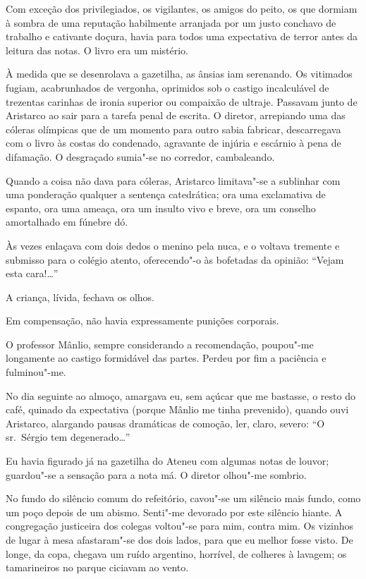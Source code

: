 Com exceção dos privilegiados, os vigilantes,
os amigos do peito, os que dormiam à sombra de uma reputação habilmente
arranjada por um justo conchavo de trabalho e cativante doçura, havia
para todos uma expectativa de terror antes da leitura das notas. O
livro era um mistério. 


À medida que se desenrolava a gazetilha, as
ânsias iam serenando. Os vitimados fugiam, acabrunhados de vergonha,
oprimidos sob o castigo incalculável de trezentas carinhas de ironia
superior ou compaixão de ultraje. Passavam junto de Aristarco ao sair
para a tarefa penal de escrita. O diretor, arrepiando uma das cóleras
olímpicas que de um momento para outro sabia fabricar, descarregava com
o livro às costas do condenado, agravante de injúria e escárnio à pena
de difamação. O desgraçado sumia"-se no corredor, cambaleando. 

Quando a coisa não dava para cóleras, Aristarco limitava"-se a sublinhar com
uma ponderação qualquer a sentença catedrática; ora uma exclamativa de
espanto, ora uma ameaça, ora um insulto vivo e breve, ora um conselho
amortalhado em fúnebre dó. 

Às vezes enlaçava com dois dedos o menino
pela nuca, e o voltava tremente e submisso para o colégio atento,
oferecendo"-o às bofetadas da opinião: ``Vejam esta cara!\ldots{}'' 

A criança, lívida, fechava os olhos. 

Em compensação, não havia expressamente punições corporais. 

O professor Mânlio, sempre
considerando a recomendação, poupou"-me longamente ao castigo
formidável das partes. Perdeu por fim a paciência e fulminou"-me. 

No dia seguinte ao almoço, amargava eu, sem açúcar que me bastasse, o
resto do café, quinado da expectativa (porque Mânlio me tinha
prevenido), quando ouvi Aristarco, alargando pausas dramáticas de
comoção, ler, claro, severo: ``O sr.~Sérgio tem degenerado\ldots{}'' 

Eu havia figurado já na gazetilha do Ateneu com algumas notas de louvor;
guardou"-se a sensação para a nota má. O diretor olhou"-me sombrio.

No fundo do silêncio comum do refeitório, cavou"-se um silêncio mais
fundo, como um poço depois de um abismo. Senti"-me devorado por este
silêncio hiante. A congregação justiceira dos colegas voltou"-se para
mim, contra mim. Os vizinhos de lugar à mesa afastaram"-se dos dois
lados, para que eu melhor fosse visto. De longe, da copa, chegava um
ruído argentino, horrível, de colheres à lavagem; os tamarineiros no
parque ciciavam ao vento. 

